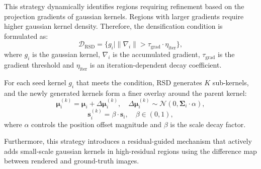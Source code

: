 \documentclass[runningheads]{llncs}
\begin{document}
This strategy dynamically identifies regions requiring refinement based on the projection gradients of gaussian kernels. Regions with larger gradients require higher gaussian kernel density. Therefore, the densification condition is formulated as:
\begin{equation}
\mathcal{D}_{\text{RSD}} = \{g_i \mid \|\nabla_i\| > \tau_{\text{grad}} \cdot \eta_{\text{iter}}\},
\end{equation}
where \(g_i\) is the gaussian kernel, \(\nabla_i\) is the accumulated gradient, \(\tau_{\text{grad}}\) is the gradient threshold and \(\eta_{\text{iter}}\) is an iteration-dependent decay coefficient.

For each seed kernel \(g_i\) that meets the condition, RSD generates \(K\) sub-kernels, and the newly generated kernels form a finer overlay around the parent kernel:
\begin{equation}
\boldsymbol{\mu}_{i}^{(k)} = \boldsymbol{\mu}_i + \Delta\boldsymbol{\mu}_{i}^{(k)}, \quad \Delta\boldsymbol{\mu}_{i}^{(k)} \sim \mathcal{N}(0, \boldsymbol{\Sigma}_i \cdot \alpha),
\end{equation}
\begin{equation}
\boldsymbol{s}_{i}^{(k)} = \beta \cdot \boldsymbol{s}_i, \quad \beta \in (0,1),
\end{equation}
where \(\alpha\) controls the position offset magnitude and \(\beta\) is the scale decay factor.

Furthermore, this strategy introduces a residual-guided mechanism that actively adds small-scale gaussian kernels in high-residual regions using the difference map between rendered and ground-truth images.
\end{document}
